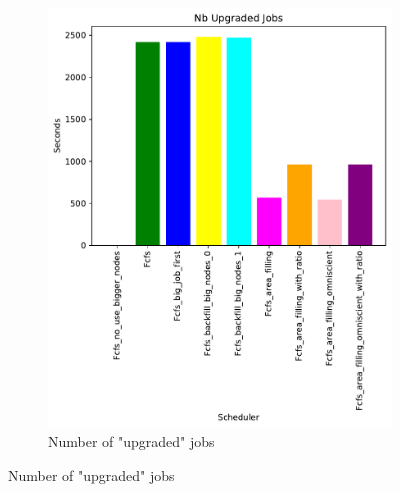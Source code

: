 \documentclass[a4paper]{article}
\begin{document}
\begin{figure}[H]\centering
\begin{subfigure}[b]{0.4\linewidth}\centering\includegraphics[width=1\linewidth]{MBSS/plot/Size_Constraint_2022-01-24->2022-01-26_Nb_Upgraded_Jobs_162_128_162_256_162_1024.pdf}\caption{Number of "upgraded" jobs}\label{27}\end{subfigure}

\end{figure}
\end{document}
